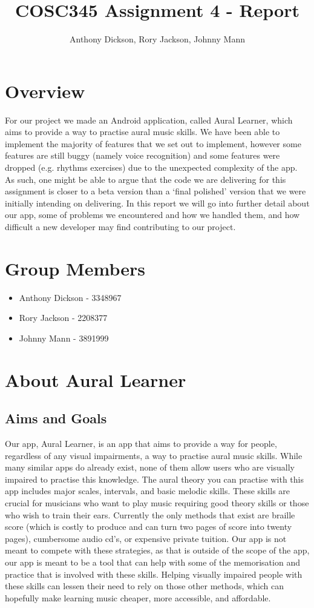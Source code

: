 \documentclass[10pt,a4paper]{article}
\author{Anthony Dickson, Rory Jackson, Johnny Mann}
\title{COSC345 Assignment 4 - Report}
\begin{document}
	
\maketitle
\tableofcontents

\section{Overview}
For our project we made an Android application, called Aural Learner, which aims to provide a way to practise aural music skills. We have been able to implement the majority of features that we set out to implement, however some features are still buggy (namely voice recognition) and some features were dropped (e.g. rhythms exercises) due to the unexpected complexity of the app. As such, one might be able to argue that the code we are delivering for this assignment is closer to a beta version than a ‘final polished’ version that we were initially intending on delivering. In this report we will go into further detail about our app, some of problems we encountered and how we handled them, and how difficult a new developer may find contributing to our project.

\section{Group Members}
\begin{itemize}
	\item Anthony Dickson - 3348967
	\item Rory Jackson - 2208377
	\item Johnny Mann - 3891999
\end{itemize}

\section{About Aural Learner}
\subsection{Aims and Goals}
Our app, Aural Learner, is an app that aims to provide a way for people, regardless of any visual impairments, a way to practise aural music skills. While many similar apps do already exist, none of them allow users who are visually impaired to practise this knowledge. The aural theory you can practise with this app includes major scales, intervals, and basic melodic skills. These skills are crucial for musicians who want to play music requiring good theory skills or those who wish to train their ears. Currently the only methods that exist are braille score (which is costly to produce and can turn two pages of score into twenty pages), cumbersome audio cd’s, or expensive private tuition. Our app is not meant to compete with these strategies, as that is outside of the scope of the app, our app is meant to be a tool that can help with some of the memorisation and practice that is involved with these skills. Helping visually impaired people with these skills can lessen their need to rely on those other methods, which can hopefully make learning music cheaper, more accessible, and affordable.
\end{document}

